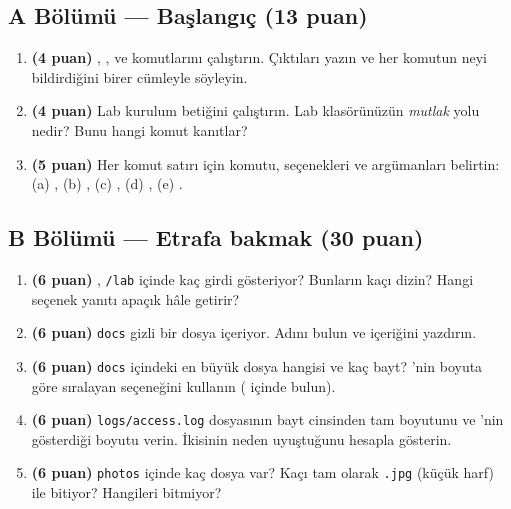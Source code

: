 \subsection*{A Bölümü --- Başlangıç (13 puan)}
\begin{enumerate}[label=\textbf{A\arabic*}, leftmargin=2.2em]
  \item \textbf{(4 puan)} , ,  ve  komutlarını çalıştırın. Çıktıları yazın ve her komutun neyi bildirdiğini birer cümleyle söyleyin.
  \item \textbf{(4 puan)} Lab kurulum betiğini çalıştırın. Lab klasörünüzün \emph{mutlak} yolu nedir? Bunu hangi komut kanıtlar?
  \item \textbf{(5 puan)} Her komut satırı için komutu, seçenekleri ve argümanları belirtin: (a) , (b) , (c) , (d) , (e) .
\end{enumerate}

\subsection*{B Bölümü --- Etrafa bakmak (30 puan)}
\begin{enumerate}[label=\textbf{B\arabic*}, leftmargin=2.2em, start=4]
  \item \textbf{(6 puan)} , \texttt{\tl/lab} içinde kaç girdi gösteriyor? Bunların kaçı dizin? Hangi seçenek yanıtı apaçık hâle getirir?
  \item \textbf{(6 puan)} \texttt{docs} gizli bir dosya içeriyor. Adını bulun ve içeriğini yazdırın.
  \item \textbf{(6 puan)} \texttt{docs} içindeki en büyük dosya hangisi ve kaç bayt? 'nin boyuta göre sıralayan seçeneğini kullanın ( içinde bulun).
  \item \textbf{(6 puan)} \texttt{logs/access.log} dosyasının bayt cinsinden tam boyutunu ve 'nin gösterdiği boyutu verin. İkisinin neden uyuştuğunu hesapla gösterin.
  \item \textbf{(6 puan)} \texttt{photos} içinde kaç dosya var? Kaçı tam olarak \texttt{.jpg} (küçük harf) ile bitiyor? Hangileri bitmiyor?
\end{enumerate}

